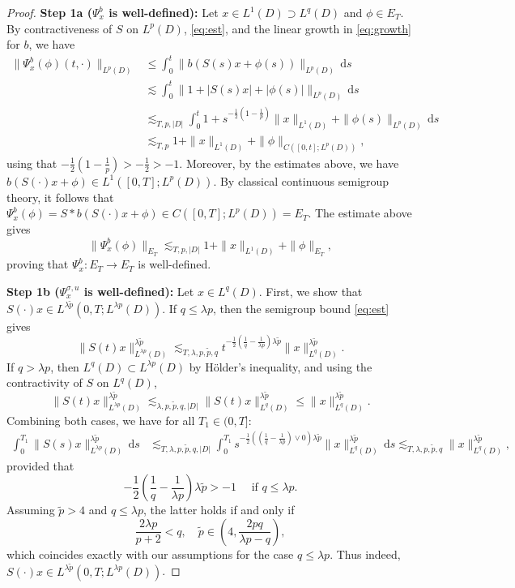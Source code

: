 \documentclass[10pt,a4paper]{amsart}
\numberwithin{equation}{section}
\newcommand{\col}{\colon}
\newcommand{\dd}{\,\mathrm{d}}
\begin{document}
\begin{proof}  
\textbf{Step 1a ($\Psi_x^b$ is well-defined):}
Let $x \in L^1(D) \supset L^q(D)$ and $\phi \in E_T$. By contractiveness of $S$ on $L^p(D)$, \eqref{eq:est}, and the linear growth in \eqref{eq:growth} for $b$, we have  
\begin{align*}
\|\Psi_x^b(\phi)(t,\cdot)\|_{L^p(D)}
&\leq   \int_0^t  \|b(S(s)x+\phi(s))\|_{L^p(D)}\dd s \\
&\lesssim \int_0^t  \|1+|S(s) x| + |\phi(s)|\|_{L^p(D)}\dd s\\
&\lesssim_{T,p,|D|}\int_0^t  1+ s^{-\frac12(1-\frac1p)}\|x\|_{L^1(D)}+\|\phi(s)\|_{L^p(D)} \dd s\\
&\lesssim_{T,p}  1 +   \|x\|_{L^1(D)} +  \|\phi\|_{C([0,t];L^p(D))},
\end{align*}  
using that $-\frac12(1-\frac1p)>-\frac12>-1$. 
Moreover, by the estimates above, we have $b(S(\cdot)x+\phi)\in L^1([0,T];L^{p}(D))$. By classical continuous semigroup theory, it follows that $\Psi_x^b(\phi)=S*b(S(\cdot)x+\phi)\in C([0,T];L^p(D))= E_T$.  
The estimate above gives
\[
\|\Psi_x^b(\phi)\|_{E_T}\lesssim_{T,p,|D|}1 +   \|x\|_{L^1(D)} +  \|\phi\|_{E_T}, 
\]
proving that $\Psi_x^b\col E_T\to E_T$ is well-defined. 

\textbf{Step 1b ($\Psi_x^{\sigma,u}$ is well-defined):} 
Let $x\in L^q(D)$. First, we show that $S(\cdot)x\in L^{\lambda \tilde p}(0,T;L^{\lambda p}(D))$. 
If $q \leq \lambda p$, then the semigroup bound  \eqref{eq:est} gives 
\[
\|S(t)x\|_{L^{\lambda p}(D)}^{\lambda\tilde p} \lesssim_{T,\lambda, p,\tilde p,q} t^{-\frac{1}{2} (\frac{1}{q}-\frac{1}{\lambda p}) \lambda \tilde{p}}\|x\|_{L^q(D)}^{\lambda\tilde p}.
\]
If $q> \lambda p$, then $L^q(D)\subset L^{\lambda {p}}(D)$ by H\"older's inequality, and using   the contractivity of $S$ on $L^q(D)$,  
\[\|S(t) x\|_{L^{\lambda p}(D)}^{\lambda\tilde p} \lesssim_{\lambda,p,\tilde p, q,|D|} 
\|S(t) x\|_{L^{q}(D)}^{\lambda\tilde p}\leq 
\|x\|_{L^{q}(D)}^{\lambda\tilde p}.\]
Combining both cases, we have for all $T_1\in(0,T]$:
\begin{align}\label{eq:Sx Lp}
\int_0^{T_1}\|S(s)x\|_{L^{\lambda p}(D)}^{\lambda \tilde p}\dd s 
&\lesssim_{T,\lambda,p,\tilde p,q,|D|}\int_0^{T_1}s^{-\frac12((\frac1q-\frac{1}{\lambda p})\vee 0)\lambda \tilde p}\|x\|_{L^{q}(D)}^{\lambda \tilde p}\dd s \lesssim_{T,\lambda,p,\tilde p,q} \|x\|_{L^q(D)}^{\lambda\tilde p},
\end{align} 
provided that  
\[
-\frac12(\frac{1}{q}-\frac{1}{\lambda p})\lambda\tilde p >-1 \quad\text{ if } q\leq \lambda p.
\]
Assuming $\tilde p>4$ and $q\leq\lambda p$, the latter holds if and only if 
\[ 
\frac{2\lambda p}{p+2}<q,  \quad \tilde{p}\in(4,\frac{2pq}{ \lambda p-q}),
\] which coincides exactly with our assumptions for the case $q\leq\lambda p$.
Thus indeed,  $S(\cdot)x\in L^{\lambda \tilde p}(0,T;L^{\lambda p}(D))$. 


\end{proof}
\end{document}
